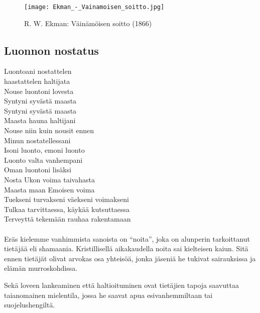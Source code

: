 
\vfill%
\begin{figure}[!ht]%
  \centering%
  \texttt{[image: Ekman\_-\_Vainamoisen\_soitto.jpg]}%
  \caption{R. W. Ekman: Väinämöisen soitto (1866)}%
\end{figure}
\vfill%


\clearpage
\subsection{Luonnon nostatus}
  \begin{large}\begin{center}\begin{em}
    Luontoani nostattelen\\
    haastattelen haltijata\\
    Nouse luontoni lovesta\\
    Syntyni syvästä maasta\\
    Syntyni syvästä maasta\\
    \vspace{1em}
    Maasta hauna haltijani\\
    Nouse niin kuin nousit ennen\\
    Minun nostatellessani\\
    \vspace{1em}
    Isoni luonto, emoni luonto\\
    Luonto valta vanhempani\\
    Oman luontoni lisäksi\\
    Nosta Ukon voima taivahasta\\
    Maasta maan Emoisen voima\\
    \vspace{1em}
    Tuekseni turvakseni väekseni voimakseni\\
    Tulkaa tarvittaessa, käykää kutsuttaessa\\
    Terveyttä tekemään rauhaa rakentamaan\\
    \vspace{1em}
  \end{em}\end{center}\end{large}

  \paragraph{}
    Eräs kielemme vanhimmista sanoista on ``noita'', joka on alunperin tarkoittanut tietäjää eli
    shamaania. Kristillisellä aikakaudella noita sai kielteisen kaiun. Sitä ennen tietäjät
    olivat arvokas osa yhteisöä, jonka jäseniä he tukivat sairauksissa ja elämän murroskohdissa.
    \par
    Sekä loveen lankeaminen että haltioituminen ovat tietäjien tapoja saavuttaa taianomainen
    mielentila, jossa he saavat apua esivanhemmiltaan tai suojelushengiltä.

